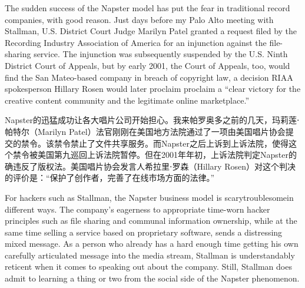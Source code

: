 \ifdefined\eng
The sudden success of the Napster model has put the fear in traditional record companies, with good reason. Just days before my Palo Alto meeting with Stallman, U.S. District Court Judge Marilyn Patel granted a request filed by the Recording Industry Association of America for an injunction against the file-sharing service. The injunction was subsequently suspended by the U.S. Ninth District Court of Appeals, but by early 2001, the Court of Appeals, too, would find the San Mateo-based company in breach of copyright law, a decision RIAA spokesperson Hillary Rosen would later proclaim \ifdefined\vone proclaim \fi a ``clear victory for the creative content community and the legitimate online marketplace.''
\fi

\ifdefined\chs
Napster的迅猛成功让各大唱片公司开始担心。我来帕罗奥多之前的几天，玛莉莲⋅帕特尔（Marilyn Patel）法官刚刚在美国地方法院通过了一项由美国唱片协会提交的禁令。该禁令禁止了文件共享服务。而Napster之后上诉到上诉法院，使得这个禁令被美国第九巡回上诉法院暂停。但在2001年年初，上诉法院判定Napster的确违反了版权法。美国唱片协会发言人希拉里⋅罗森（Hillary Rosen）对这个判决的评价是：``保护了创作者，完善了在线市场方面的法律。''
\fi

\ifdefined\eng
For hackers such as Stallman, the Napster business model is \ifdefined\vone scary\fi\ifdefined\vtwo troublesome\fi in different ways. The company's eagerness to appropriate time-worn hacker principles such as file sharing and communal information ownership, while at the same time selling a service based on proprietary software, sends a distressing mixed message. As a person who already has a hard enough time getting his own carefully articulated message into the media stream, Stallman is understandably reticent when it comes to speaking out about the company. Still, Stallman does admit to learning a thing or two from the social side of the Napster phenomenon.
\fi

